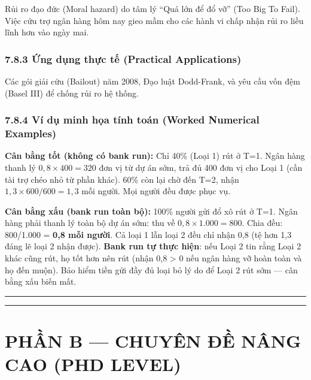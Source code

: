 \documentclass[
]{article}
\begin{document}
Rủi ro đạo đức (Moral hazard) do tâm lý ``Quá lớn để đổ vỡ'' (Too Big To
Fail). Việc cứu trợ ngân hàng hôm nay gieo mầm cho các hành vi chấp nhận
rủi ro liều lĩnh hơn vào ngày mai.

\subsubsection{7.8.3 Ứng dụng thực tế (Practical
Applications)}\label{ux1ee9ng-dux1ee5ng-thux1ef1c-tux1ebf-practical-applications-24}

Các gói giải cứu (Bailout) năm 2008, Đạo luật Dodd-Frank, và yêu cầu vốn
đệm (Basel III) để chống rủi ro hệ thống.

\subsubsection{7.8.4 Ví dụ minh họa tính toán (Worked Numerical
Examples)}\label{vuxed-dux1ee5-minh-hux1ecda-tuxednh-touxe1n-worked-numerical-examples-23}

\textbf{Cân bằng tốt (không có bank run):} Chỉ 40\% (Loại 1) rút ở T=1.
Ngân hàng thanh lý \(0{,}8 \times 400 = 320\) đơn vị từ dự án sớm, trả
đủ 400 đơn vị cho Loại 1 (cần tài trợ chéo nhỏ từ phần khác). 60\% còn
lại chờ đến T=2, nhận \(1{,}3 \times 600 / 600 = 1{,}3\) mỗi người. Mọi
người đều được phục vụ.

\textbf{Cân bằng xấu (bank run toàn bộ):} 100\% người gửi đổ xô rút ở
T=1. Ngân hàng phải thanh lý toàn bộ dự án sớm: thu về
\(0{,}8 \times 1.000 = 800\). Chia đều: 800/1.000 = \textbf{0,8 mỗi
người}. Cả loại 1 lẫn loại 2 đều chỉ nhận 0,8 (tệ hơn 1,3 đáng lẽ loại 2
nhận được). \textbf{Bank run tự thực hiện}: nếu Loại 2 tin rằng Loại 2
khác cũng rút, họ tốt hơn nên rút (nhận 0,8 \textgreater{} 0 nếu ngân
hàng vỡ hoàn toàn và họ đến muộn). Bảo hiểm tiền gửi đầy đủ loại bỏ lý
do để Loại 2 rút sớm --- cân bằng xấu biến mất.

\begin{center}\rule{0.5\linewidth}{0.5pt}\end{center}

\begin{center}\rule{0.5\linewidth}{0.5pt}\end{center}

\section{PHẦN B --- CHUYÊN ĐỀ NÂNG CAO (PHD
LEVEL)}\label{phux1ea7n-b-chuyuxean-ux111ux1ec1-nuxe2ng-cao-phd-level}
\end{document}
